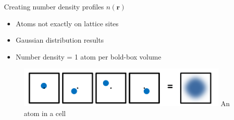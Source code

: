 \documentclass{beamer}
\renewcommand{\vec}[1]{\mathbf{#1}}
\begin{document}
\begin{frame}{Creating number density profiles $n(\vec r)$}
    \begin{itemize}
	    \item Atoms not exactly on lattice sites
		\item Gaussian distribution results
		\item Number density = 1 atom per bold-box volume
	\end{itemize}	
	
    \begin{figure}
       \centering
       \includegraphics[height=2cm]{Ensemble_Gaussian.png}
       \label{fig:Ensemble_Gaus}
        An atom in a cell
     \end{figure}     
\end{frame}	

       
    
\end{document}
